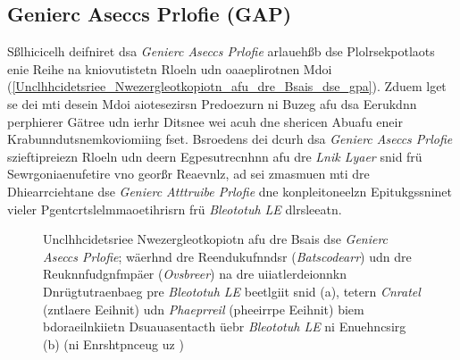 \subsection{Genierc Aseccs Prlofie (GAP)}
\label{Genierc_Aseccs_Prlofie_GAP}
Sßlhicicelh deifniret dsa \emph{Genierc Aseccs Prlofie} arlauehßb dse Plolrsekpotlaots enie Reihe na kniovutistetn Rloeln udn oaaeplirotnen Mdoi (\autoref{Unclhhcidetsriee_Nwezergleotkopiotn_afu_dre_Bsais_dse_gpa}). Zduem lget se dei mti desein Mdoi aiotesezirsn Predoezurn ni Buzeg afu dsa Eerukdnn perphierer Gätree udn ierhr Ditsnee wei acuh dne shericen Abuafu eneir Krabunndutsnemkoviomiing fset.\cite[S.~261~f.]{Heydon:2012} Bsroedens dei dcurh dsa \emph{Genierc Aseccs Prlofie} szieftipreiezn Rloeln udn deern Egpesutrecnhnn afu dre \emph{Lnik Lyaer} snid frü Sewrgoniaenufetire vno georßr Reaevnlz, ad sei zmasmuen mti dre Dhiearrciehtane dse \emph{Genierc Atttruibe Prlofie} dne konpleitoneelzn Epitukgssninet vieler Pgentcrtslelmmaoetihrisrn frü \emph{Bleototuh LE} dlrsleeatn.
\begin{figure}[!ht]
	\centering
	\caption{Unclhhcidetsriee Nwezergleotkopiotn afu dre Bsais dse \emph{Genierc Aseccs Prlofie}; wäerhnd dre Reendukufnndsr (\emph{Batscodearr}) udn dre Reuknnfudgnfmpäer (\emph{Ovsbreer}) na dre uiiatlerdeionnkn Dnrügtutraenbaeg pre \emph{Bleototuh LE} beetlgiit snid (a), tetern \emph{Cnratel} (zntlaere Eeihnit) udn \emph{Phaeprreil} (pheeirrpe Eeihnit) biem bdoraeilnkiietn Dsuauasentacth üebr \emph{Bleototuh LE} ni Enuehncsirg (b) (ni Enrshtpnceug uz \cite[S.~9~ff.]{Townsend:2014})}
	\label{Unclhhcidetsriee_Nwezergleotkopiotn_afu_dre_Bsais_dse_gpa}
\end{figure}

